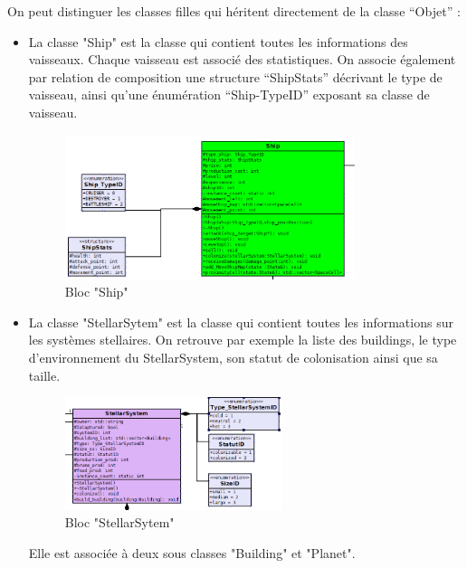 On peut distinguer les classes filles qui héritent directement de la classe “Objet” :

\begin{itemize}
    \item La classe "Ship" est la classe qui contient toutes les informations des vaisseaux. Chaque vaisseau est associé des statistiques.  On associe
également par relation de composition une structure “ShipStats” décrivant
le type de vaisseau, ainsi qu’une énumération “Ship-TypeID” exposant sa
classe de vaisseau.
\begin{figure}[!h]
\centering
\includegraphics[width=0.8\textwidth]{pics/final_state/classe_vaisseau1.PNG}
\caption[Bloc "Ship"]{\label{figure_simple}Bloc "Ship"}
\end{figure}

\item La classe "StellarSytem" est la classe qui contient toutes les informations sur les systèmes stellaires. On retrouve par exemple la liste des buildings, le type d'environnement du StellarSystem, son statut de colonisation ainsi que sa taille. \\

\begin{figure}[!h]
\centering
\includegraphics[width=0.6\textwidth]{pics/final_state/classe_StellarSystem.PNG}
\caption[Bloc "StellarSytem"]{\label{figure_simple}Bloc "StellarSytem"}
\end{figure}

Elle est associée à deux sous classes "Building" et "Planet".\\


\end{itemize}
